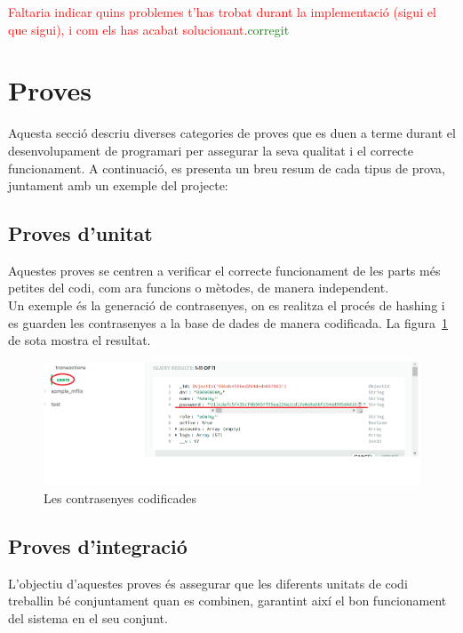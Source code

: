 \documentclass[a4paper,12pt,twoside]{ThesisStyle}
\newcommand{\pau}[1]{\textcolor{red}{#1}}
\newcommand{\sudan}[1]{\textcolor{green}{#1}}
\begin{document}
\pau{Faltaria indicar quins problemes t'has trobat durant la implementació (sigui el que sigui), i com els has acabat solucionant.}\sudan{corregit}


\section{Proves}
\label{sec: Proves}

Aquesta secció descriu diverses categories de proves que es duen a terme durant el desenvolupament de programari per assegurar la seva qualitat i el correcte funcionament. A continuació, es presenta un breu resum de cada tipus de prova, juntament amb un exemple del projecte:

\subsection{Proves d'unitat}
\label{subsec:Proves d'unitat}

Aquestes proves se centren a verificar el correcte funcionament de les parts més petites del codi, com ara funcions o mètodes, de manera independent.\\

Un exemple és la generació de contrasenyes, on es realitza el procés de hashing i es guarden les contrasenyes a la base de dades de manera codificada. La figura~\ref{fig: Les contrasenyes codificades} de sota mostra el resultat.

\clearpage
\begin{figure}[h]   
    \centering
    \includegraphics[width=1\textwidth]{imatges/prova1.png}
    \caption{Les contrasenyes codificades}
    \label{fig: Les contrasenyes codificades}
\end{figure}


\subsection{Proves d'integració}
\label{subsec:Proves d'integració}

L'objectiu d'aquestes proves és assegurar que les diferents unitats de codi treballin bé conjuntament quan es combinen, garantint així el bon funcionament del sistema en el seu conjunt.\\
\end{document}

